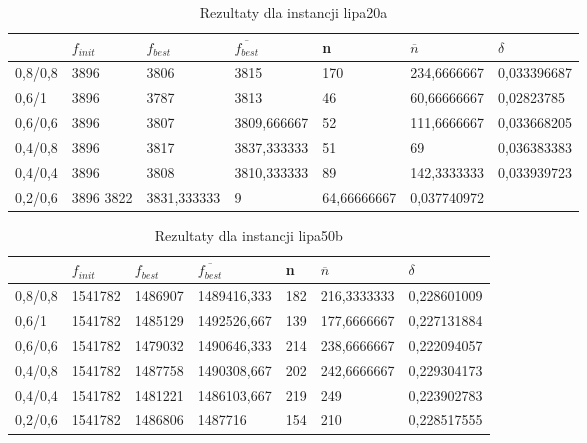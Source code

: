 \begin{table}[H]
\label{T3_lipa20a}
\begin{tabular}{l l l l l l l}
\hline
 & $f_{init}$ & $f_{best}$ & $\overline{f_{best}}$ & n & $\overline{n}$ & $\delta$ \\
\hline
0,8/0,8 & 3896 & 3806 & 3815 & 170 & 234,6666667 & 0,033396687\\
0,6/1 & 3896 & 3787 & 3813 & 46 & 60,66666667 & 0,02823785\\
0,6/0,6 & 3896 & 3807 & 3809,666667 & 52 & 111,6666667 & 0,033668205\\
0,4/0,8 & 3896 & 3817 & 3837,333333 & 51 & 69 & 0,036383383\\
0,4/0,4 & 3896 & 3808 & 3810,333333 & 89 & 142,3333333 & 0,033939723\\
0,2/0,6 & 3896	3822 & 3831,333333 & 9 & 64,66666667 & 0,037740972\\
\hline
\end{tabular}
\caption{Rezultaty dla instancji lipa20a}
\end{table}

\begin{table}[H]
\label{T3_lipa50b}
\begin{tabular}{l l l l l l l}
\hline
 & $f_{init}$ & $f_{best}$ & $\overline{f_{best}}$ & n & $\overline{n}$ & $\delta$ \\
\hline
0,8/0,8 & 1541782 & 1486907 & 1489416,333 & 182 & 216,3333333 & 0,228601009\\
0,6/1 & 1541782 & 1485129 & 1492526,667 & 139 & 177,6666667 & 0,227131884\\
0,6/0,6 & 1541782 & 1479032 & 1490646,333 & 214 & 238,6666667 & 0,222094057\\
0,4/0,8 & 1541782 & 1487758 & 1490308,667 & 202 & 242,6666667 & 0,229304173\\
0,4/0,4 & 1541782 & 1481221 & 1486103,667 & 219 & 249 & 0,223902783\\
0,2/0,6 & 1541782 & 1486806 & 1487716 & 154 & 210 & 0,228517555\\
\hline
\end{tabular}
\caption{Rezultaty dla instancji lipa50b}
\end{table}

